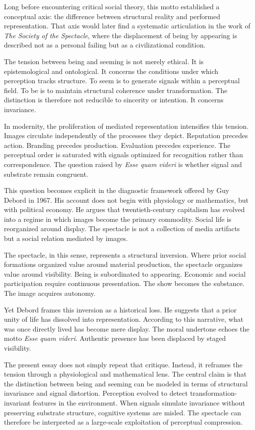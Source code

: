 \documentclass[11pt]{article}
\begin{document}
Long before encountering critical social theory, this motto established a conceptual axis: the difference between structural reality and performed representation. That axis would later find a systematic articulation in the work of \textit{The Society of the Spectacle}, where the displacement of being by appearing is described not as a personal failing but as a civilizational condition.

The tension between being and seeming is not merely ethical. It is epistemological and ontological. It concerns the conditions under which perception tracks structure. To seem is to generate signals within a perceptual field. To be is to maintain structural coherence under transformation. The distinction is therefore not reducible to sincerity or intention. It concerns invariance.

In modernity, the proliferation of mediated representation intensifies this tension. Images circulate independently of the processes they depict. Reputation precedes action. Branding precedes production. Evaluation precedes experience. The perceptual order is saturated with signals optimized for recognition rather than correspondence. The question raised by \textit{Esse quam videri} is whether signal and substrate remain congruent.

This question becomes explicit in the diagnostic framework offered by Guy Debord in 1967. His account does not begin with physiology or mathematics, but with political economy. He argues that twentieth-century capitalism has evolved into a regime in which images become the primary commodity. Social life is reorganized around display. The spectacle is not a collection of media artifacts but a social relation mediated by images.

The spectacle, in this sense, represents a structural inversion. Where prior social formations organized value around material production, the spectacle organizes value around visibility. Being is subordinated to appearing. Economic and social participation require continuous presentation. The show becomes the substance. The image acquires autonomy.

Yet Debord frames this inversion as a historical loss. He suggests that a prior unity of life has dissolved into representation. According to this narrative, what was once directly lived has become mere display. The moral undertone echoes the motto \textit{Esse quam videri}. Authentic presence has been displaced by staged visibility.

The present essay does not simply repeat that critique. Instead, it reframes the tension through a physiological and mathematical lens. The central claim is that the distinction between being and seeming can be modeled in terms of structural invariance and signal distortion. Perception evolved to detect transformation-invariant features in the environment. When signals simulate invariance without preserving substrate structure, cognitive systems are misled. The spectacle can therefore be interpreted as a large-scale exploitation of perceptual compression.
\end{document}
